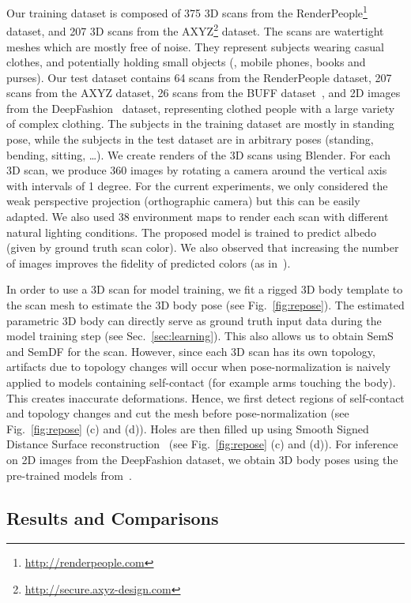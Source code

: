 \documentclass[10pt,twocolumn,letterpaper]{article}
\newcommand{\aftersection}{\vspace{-1mm}}
\newcommand{\beforesubsection}{\vspace{0mm}}
\begin{document}
Our training dataset is composed of 375 3D scans from the RenderPeople\footnote{\url{http://renderpeople.com}} dataset, and 207 3D scans from the AXYZ\footnote{\url{http://secure.axyz-design.com}} dataset. The scans are watertight meshes which are mostly free of noise.
They represent subjects wearing casual clothes, and potentially holding small objects (\eg, mobile phones, books and purses).
Our test dataset contains 64 scans from the RenderPeople dataset, 207 scans from the AXYZ dataset, 26 scans from the BUFF dataset~\cite{zhang-CVPR17}, and 2D images from the DeepFashion~\cite{liu2016deepfashion} dataset, representing clothed people with a large variety of complex clothing.
The subjects in the training dataset are mostly in standing pose, while the subjects in the test dataset are in arbitrary poses (standing, bending, sitting, \ldots).
We create renders of the 3D scans using Blender.
For each 3D scan, we produce 360 images by rotating a camera around the vertical axis with intervals of 1 degree.
For the current experiments, we only considered the weak perspective projection (orthographic camera) but this can be easily adapted.
We also used 38 environment maps to render each scan with different natural lighting conditions.
The proposed model is trained to predict albedo (given by ground truth scan color).
We also observed that increasing the number of images improves the fidelity of predicted colors (as in~\cite{PIFuICCV19}).

In order to use a 3D scan for model training, we fit a rigged 3D body template to the scan mesh to estimate the 3D body pose (see Fig.~\ref{fig:repose}).
The estimated parametric 3D body can directly serve as ground truth input data during the model training step (see Sec.~\ref{sec:learning}).
This also allows us to obtain SemS and SemDF for the scan.
However, since each 3D scan has its own topology, artifacts due to topology changes will occur when pose-normalization is naively applied to models containing self-contact (for example arms touching the body). This creates inaccurate deformations.
Hence, we first detect regions of self-contact and topology changes and cut the mesh before pose-normalization (see Fig.~\ref{fig:repose} (c) and (d)). Holes are then filled up using Smooth Signed Distance Surface reconstruction~\cite{calakli11}  (see Fig.~\ref{fig:repose} (c) and (d)).
For inference on 2D images from the DeepFashion dataset, we obtain 3D body poses using the pre-trained models from~\cite{DenseRaCICCV19}.

\beforesubsection
\subsection{Results and Comparisons} \label{sec:result}
\aftersection
\end{document}
